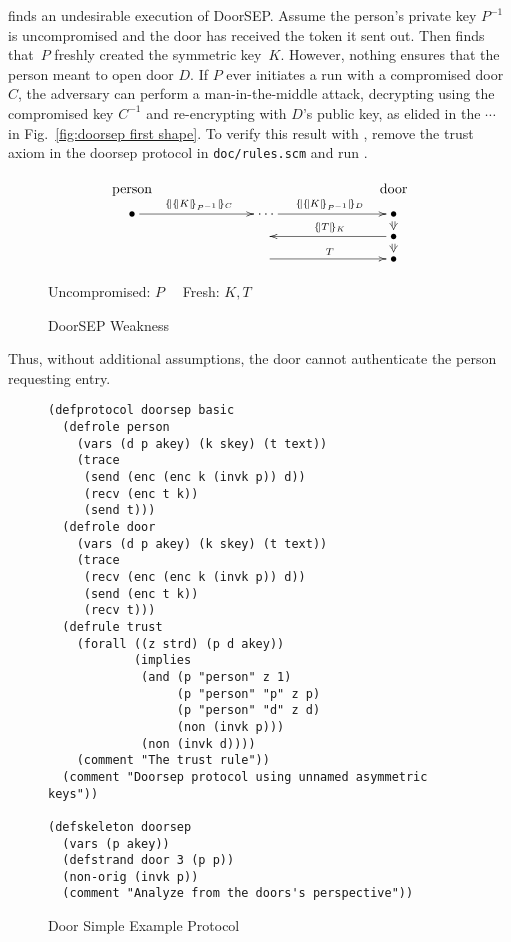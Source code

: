\documentclass[12pt]{article}
\newcommand{\iv}[1]{\ensuremath{{#1}^{-1}}}
\begin{document}
{\cpsa} finds an undesirable execution of DoorSEP.  Assume the
person's private key \iv{P} is uncompromised and the door has received
the token it sent out.  Then {\cpsa} finds that~$P$ freshly created
the symmetric key~$K$.  However, nothing ensures that the person meant
to open door $D$.  If $P$ ever initiates a run with a compromised
door~$C$, the adversary can perform a man-in-the-middle attack,
decrypting using the compromised key $C^{-1}$ and re-encrypting with
$D$'s public key, as elided in the $\cdots$ in Fig.~\ref{fig:doorsep
  first shape}.  To verify this result with , remove the trust
axiom in the doorsep protocol in \texttt{doc/rules.scm} and run .
%
\begin{figure}[tb]
  \[\xymatrix@R=2mm@C=7em{
    \txt{\strut person}&&\txt{\strut door}\\
    \bullet \ar[r]^{\enc{\enc{K}{\iv{P}}}{C}} & \cdots\ar[r]^{\enc{\enc{K}{\iv{P}}}{D}} &
    \bullet\ar@{=>}[d] \\
    & \null &   \bullet\ar@{=>}[d]\ar[l]_{\enc{T}{K}}\\
    &\null\ar[r]^T & \bullet}\]
  \begin{center}
    Uncompromised: $P\quad$ Fresh: $K, T$
  \end{center}
  \caption{DoorSEP Weakness}\label{fig:doorsep first shape}
\end{figure}
%
%
Thus, without additional assumptions, the door cannot authenticate the
person requesting entry.

\begin{figure}
\begin{verbatim}
(defprotocol doorsep basic
  (defrole person
    (vars (d p akey) (k skey) (t text))
    (trace
     (send (enc (enc k (invk p)) d))
     (recv (enc t k))
     (send t)))
  (defrole door
    (vars (d p akey) (k skey) (t text))
    (trace
     (recv (enc (enc k (invk p)) d))
     (send (enc t k))
     (recv t)))
  (defrule trust
    (forall ((z strd) (p d akey))
            (implies
             (and (p "person" z 1)
                  (p "person" "p" z p)
                  (p "person" "d" z d)
                  (non (invk p)))
             (non (invk d))))
    (comment "The trust rule"))
  (comment "Doorsep protocol using unnamed asymmetric keys"))

(defskeleton doorsep
  (vars (p akey))
  (defstrand door 3 (p p))
  (non-orig (invk p))
  (comment "Analyze from the doors's perspective"))
\end{verbatim}
\caption{Door Simple Example Protocol}\label{fig:doorsep}
\end{figure}
\end{document}

